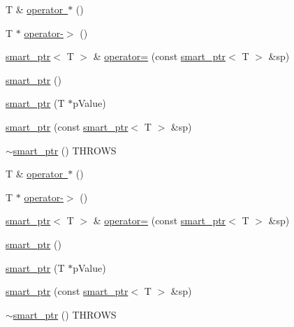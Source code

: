 \begin{DoxyCompactItemize}
\item 
T \& \mbox{\hyperlink{classfakeit_1_1smart__ptr_a6ad907f45c59a2519248f5a79191992e}{operator $\ast$}} ()
\item 
T $\ast$ \mbox{\hyperlink{classfakeit_1_1smart__ptr_aa9b3019d80eee2f376a9b92ef8080ffc}{operator-\/$>$}} ()
\item 
\mbox{\hyperlink{classfakeit_1_1smart__ptr}{smart\+\_\+ptr}}$<$ T $>$ \& \mbox{\hyperlink{classfakeit_1_1smart__ptr_a76edf2172f564378c77dc88a419f6634}{operator=}} (const \mbox{\hyperlink{classfakeit_1_1smart__ptr}{smart\+\_\+ptr}}$<$ T $>$ \&sp)
\item 
\mbox{\hyperlink{classfakeit_1_1smart__ptr_ad718f001e0b0815c80d5cef4f2d4a99a}{smart\+\_\+ptr}} ()
\item 
\mbox{\hyperlink{classfakeit_1_1smart__ptr_afa05248e2dceb62a7ecc706700cfd1bf}{smart\+\_\+ptr}} (T $\ast$p\+Value)
\item 
\mbox{\hyperlink{classfakeit_1_1smart__ptr_a1157d28b4675e32ae90886871fb1b0bd}{smart\+\_\+ptr}} (const \mbox{\hyperlink{classfakeit_1_1smart__ptr}{smart\+\_\+ptr}}$<$ T $>$ \&sp)
\item 
\mbox{\hyperlink{classfakeit_1_1smart__ptr_a0a184c081564a5a22d8ad0a121614bc5}{$\sim$smart\+\_\+ptr}} () T\+H\+R\+O\+WS
\item 
T \& \mbox{\hyperlink{classfakeit_1_1smart__ptr_a6ad907f45c59a2519248f5a79191992e}{operator $\ast$}} ()
\item 
T $\ast$ \mbox{\hyperlink{classfakeit_1_1smart__ptr_aa9b3019d80eee2f376a9b92ef8080ffc}{operator-\/$>$}} ()
\item 
\mbox{\hyperlink{classfakeit_1_1smart__ptr}{smart\+\_\+ptr}}$<$ T $>$ \& \mbox{\hyperlink{classfakeit_1_1smart__ptr_a76edf2172f564378c77dc88a419f6634}{operator=}} (const \mbox{\hyperlink{classfakeit_1_1smart__ptr}{smart\+\_\+ptr}}$<$ T $>$ \&sp)
\item 
\mbox{\hyperlink{classfakeit_1_1smart__ptr_ad718f001e0b0815c80d5cef4f2d4a99a}{smart\+\_\+ptr}} ()
\item 
\mbox{\hyperlink{classfakeit_1_1smart__ptr_afa05248e2dceb62a7ecc706700cfd1bf}{smart\+\_\+ptr}} (T $\ast$p\+Value)
\item 
\mbox{\hyperlink{classfakeit_1_1smart__ptr_a1157d28b4675e32ae90886871fb1b0bd}{smart\+\_\+ptr}} (const \mbox{\hyperlink{classfakeit_1_1smart__ptr}{smart\+\_\+ptr}}$<$ T $>$ \&sp)
\item 
\mbox{\hyperlink{classfakeit_1_1smart__ptr_a0a184c081564a5a22d8ad0a121614bc5}{$\sim$smart\+\_\+ptr}} () T\+H\+R\+O\+WS
\item 

\end{DoxyCompactItemize}
